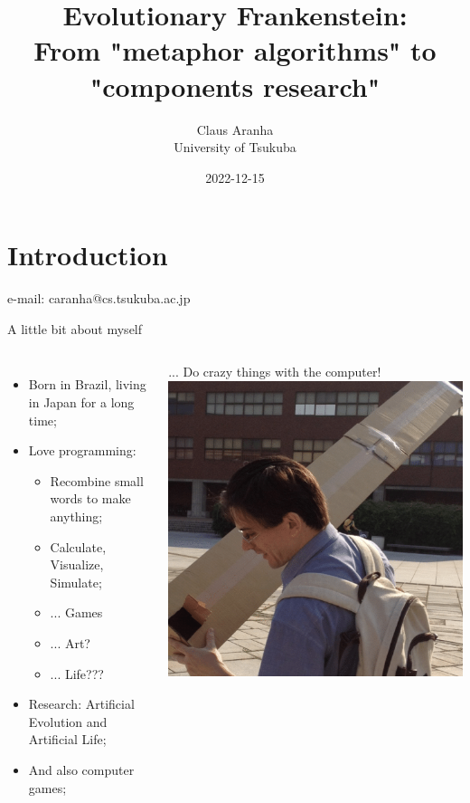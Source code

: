 \documentclass[aspectratio=169]{beamer}
\title[Evolutionary Frankenstein]{Evolutionary Frankenstein:\\ From "metaphor algorithms" to "components research"}
\author[Claus Aranha]{Claus Aranha\\University of Tsukuba}
\date{2022-12-15}
\begin{document}
\section{Introduction}
\begin{frame}
  \maketitle

  \vfill

  \hfill\footnotesize{e-mail: caranha@cs.tsukuba.ac.jp}
\end{frame}


\begin{frame}{A little bit about myself}
  \begin{columns}
    \begin{itemize}
      \item Born in Brazil, living in Japan for a long time;
      \item Love programming:
      \begin{itemize}
        \item Recombine small words to make anything;
        \item Calculate, Visualize, Simulate;
        \item ... Games
        \item ... Art?
        \item ... Life???
      \end{itemize}
      \item Research: Artificial Evolution and Artificial Life;
      \item And also computer games;
    \end{itemize}
    \vfill
    \hfill ... Do crazy things with the computer!
    \includegraphics[width=.9\textwidth]{img/Claus_Eclipse}
  \end{columns}
\end{frame}
\end{document}
